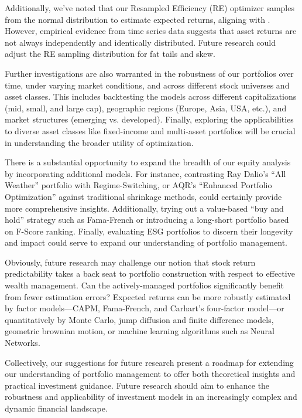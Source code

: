 \documentclass[12pt,letterpaper]{article}
\begin{document}
Additionally, we've noted that our Resampled Efficiency (RE) optimizer samples from the normal distribution to estimate expected returns, aligning with . However, empirical evidence from time series data suggests that asset returns are not always independently and identically distributed. Future research could adjust the RE sampling distribution for fat tails and skew.

Further investigations are also warranted in the robustness of our portfolios over time, under varying market conditions, and across different stock universes and asset classes. This includes backtesting the models across different capitalizations (mid, small, and large cap), geographic regions (Europe, Asia, USA, etc.), and market structures (emerging vs. developed). Finally, exploring the applicabilities to diverse asset classes like fixed-income and multi-asset portfolios will be crucial in understanding the broader utility of optimization.

There is a substantial opportunity to expand the breadth of our equity analysis by incorporating additional models. For instance, contrasting Ray Dalio's “All Weather” portfolio with Regime-Switching, or AQR's “Enhanced Portfolio Optimization” against traditional shrinkage methods, could certainly provide more comprehensive insights. Additionally, trying out a value-based “buy and hold” strategy such as Fama-French or introducing a long-short portfolio based on F-Score ranking. Finally, evaluating ESG portfolios to discern their longevity and impact could serve to expand our understanding of portfolio management.

Obviously, future research may challenge our notion that stock return predictability takes a back seat to portfolio construction with respect to effective wealth management. Can the actively-managed portfolios significantly benefit from fewer estimation errors? Expected returns can be more robustly estimated by factor models---CAPM, Fama-French, and Carhart's four-factor model---or quantitatively by Monte Carlo, jump diffusion and finite difference models, geometric brownian motion, or machine learning algorithms such as Neural Networks.

Collectively, our suggestions for future research present a roadmap for extending our understanding of portfolio management to offer both theoretical insights and practical investment guidance. Future research should aim to enhance the robustness and applicability of investment models in an increasingly complex and dynamic financial landscape.
\end{document}
